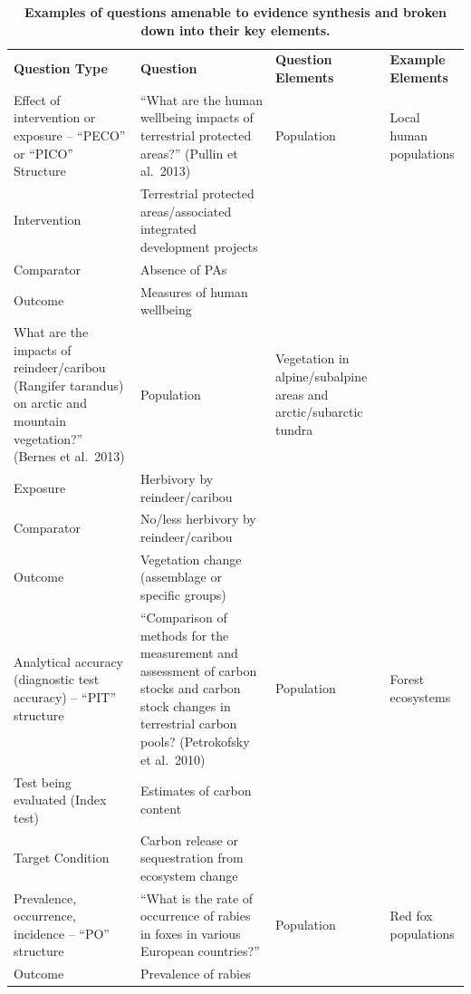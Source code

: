 \documentclass[
  letterpaper,
  DIV=11,
  numbers=noendperiod]{scrreprt}
\begin{document}
\begin{longtable}[]{@{}
  >{\raggedright\arraybackslash}p{}
  >{\raggedright\arraybackslash}p{}
  >{\raggedright\arraybackslash}p{}
  >{\raggedright\arraybackslash}p{}@{}}
\caption{\textbf{Examples of questions amenable to evidence synthesis
and broken down into their key
elements.}}\label{tbl-elements}\tabularnewline
\toprule\noalign{}
\endfirsthead
\endhead
\bottomrule\noalign{}
\endlastfoot
\textbf{Question Type} & \textbf{Question} & \textbf{Question Elements}
& \textbf{Example Elements} \\
Effect of intervention or exposure -- ``PECO'' or ``PICO'' Structure &
``What are the human wellbeing impacts of terrestrial protected areas?''
(Pullin et al.~2013) & Population & Local human populations \\
Intervention & Terrestrial protected areas/associated integrated
development projects & & \\
Comparator & Absence of PAs & & \\
Outcome & Measures of human wellbeing & & \\
What are the impacts of reindeer/caribou (Rangifer tarandus) on arctic
and mountain vegetation?'' (Bernes et al.~2013) & Population &
Vegetation in alpine/subalpine areas and arctic/subarctic tundra & \\
Exposure & Herbivory by reindeer/caribou & & \\
Comparator & No/less herbivory by reindeer/caribou & & \\
Outcome & Vegetation change (assemblage or specific groups) & & \\
Analytical accuracy (diagnostic test accuracy) -- ``PIT'' structure &
``Comparison of methods for the measurement and assessment of carbon
stocks and carbon stock changes in terrestrial carbon pools?
(Petrokofsky et al.~2010) & Population & Forest ecosystems \\
Test being evaluated (Index test) & Estimates of carbon content & & \\
Target Condition & Carbon release or sequestration from ecosystem change
& & \\
Prevalence, occurrence, incidence -- ``PO'' structure & ``What is the
rate of occurrence of rabies in foxes in various European countries?'' &
Population & Red fox populations \\
Outcome & Prevalence of rabies & & \\
\end{longtable}
\end{document}
